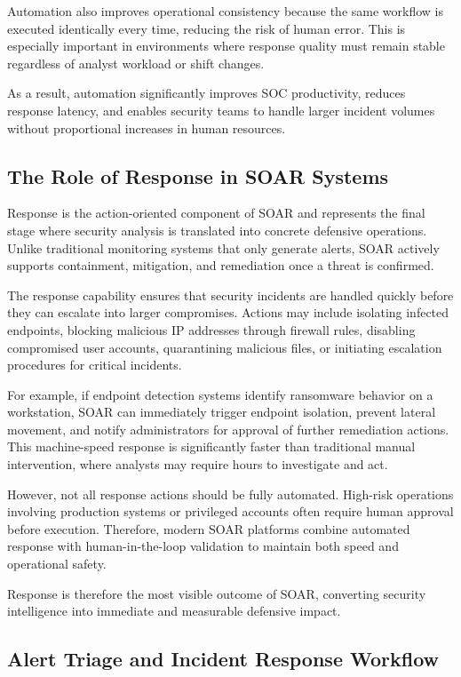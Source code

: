 \documentclass[12pt]{report}
\begin{document}
Automation also improves operational consistency because the same workflow is executed identically every time, reducing the risk of human error. This is especially important in environments where response quality must remain stable regardless of analyst workload or shift changes.

As a result, automation significantly improves SOC productivity, reduces response latency, and enables security teams to handle larger incident volumes without proportional increases in human resources.

\subsection{The Role of Response in SOAR Systems}

Response is the action-oriented component of SOAR and represents the final stage where security analysis is translated into concrete defensive operations. Unlike traditional monitoring systems that only generate alerts, SOAR actively supports containment, mitigation, and remediation once a threat is confirmed.

The response capability ensures that security incidents are handled quickly before they can escalate into larger compromises. Actions may include isolating infected endpoints, blocking malicious IP addresses through firewall rules, disabling compromised user accounts, quarantining malicious files, or initiating escalation procedures for critical incidents.

For example, if endpoint detection systems identify ransomware behavior on a workstation, SOAR can immediately trigger endpoint isolation, prevent lateral movement, and notify administrators for approval of further remediation actions. This machine-speed response is significantly faster than traditional manual intervention, where analysts may require hours to investigate and act.

However, not all response actions should be fully automated. High-risk operations involving production systems or privileged accounts often require human approval before execution. Therefore, modern SOAR platforms combine automated response with human-in-the-loop validation to maintain both speed and operational safety.

Response is therefore the most visible outcome of SOAR, converting security intelligence into immediate and measurable defensive impact.

\subsection{Alert Triage and Incident Response Workflow}
\end{document}
